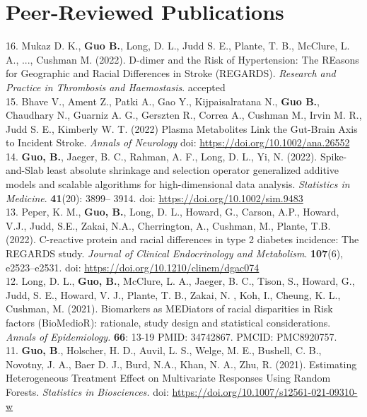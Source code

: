 \section{Peer-Reviewed Publications}

\vspace{-3ex}


16. Mukaz D. K., \textbf{Guo B.}, Long, D. L., Judd S. E., Plante, T. B., McClure, L. A., ...,  Cushman M. (2022). D-dimer and the Risk of Hypertension: The REasons for Geographic and Racial Differences in Stroke (REGARDS). \textit{Research and Practice in Thrombosis and Haemostasis}. accepted\\

15. Bhave V., Ament Z., Patki A., Gao Y., Kijpaisalratana N., \textbf{Guo B.}, Chaudhary N., Guarniz A. G., Gerszten R., Correa A., Cushman M., Irvin M. R., Judd S. E., Kimberly W. T. (2022) Plasma Metabolites Link the Gut-Brain Axis to Incident Stroke. {\it Annals of Neurology} doi: \url{https://doi.org/10.1002/ana.26552}\\

14. \textbf{Guo, B.}, Jaeger, B. C., Rahman, A. F., Long, D. L., Yi, N. (2022). Spike-and-Slab least absolute shrinkage and selection operator generalized additive models and scalable algorithms for high-dimensional data analysis. {\it Statistics in Medicine}. {\bf 41}(20): 3899– 3914. doi: \url{https://doi.org/10.1002/sim.9483}\\

13. Peper, K. M., \textbf{Guo, B.}, Long, D. L., Howard, G., Carson, A.P., Howard, V.J., Judd, S.E., Zakai, N.A., Cherrington, A., Cushman, M., Plante, T.B. (2022). C-reactive protein and racial differences in type 2 diabetes incidence: The REGARDS study. {\it Journal of Clinical Endocrinology and Metabolism}. {\bf 107}(6), e2523–e2531. doi: \url{https://doi.org/10.1210/clinem/dgac074}\\

12. Long, D. L., \textbf{Guo, B.}, McClure, L. A., Jaeger, B. C., Tison, S., Howard, G., Judd, S. E., Howard, V. J., Plante, T. B., Zakai, N. , Koh, I., Cheung, K. L., Cushman, M. (2021). Biomarkers as MEDiators of racial disparities in Risk factors (BioMedioR): rationale, study design and statistical considerations. \textit{Annals of Epidemiology.} {\bf 66}: 13-19 PMID: 34742867. PMCID: PMC8920757. \\

11. {\bf Guo, B}., Holscher, H. D., Auvil, L. S., Welge, M. E., Bushell, C. B., Novotny, J. A., Baer D. J., Burd, N.A., Khan, N. A., Zhu, R. (2021). Estimating Heterogeneous Treatment Effect on Multivariate Responses Using Random Forests. {\it Statistics in Biosciences.} doi: \url{https://doi.org/10.1007/s12561-021-09310-w}\\

